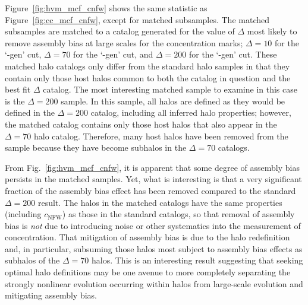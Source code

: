 \documentclass[usenatbib]{mnras}
\begin{document}
Figure~\ref{fig:hvm_mcf_cnfw} shows the same statistic as Figure~\ref{fig:cc_mcf_cnfw}, except for matched
subsamples. The matched subsamples are matched to a catalog generated for the value of $\Delta$ most likely to
remove assembly bias at large scales for the concentration marks; $\Delta=10$ for the `\simA -gen' cut, $\Delta=70$
for the `\simB -gen' cut, and $\Delta=200$ for the `\simC -gen' cut. These matched halo catalogs only differ from
the standard halo samples in that they contain only those host halos common 
to both the catalog in question and the best fit $\Delta$ catalog. The most interesting matched sample to 
examine in this case is the $\Delta=200$ sample. In this sample, all halos are defined as they would be 
defined in the $\Delta=200$ catalog, including all inferred halo properties; however, the matched catalog 
contains only those host halos that also appear in the $\Delta=70$ halo catalog. Therefore, many host 
halos have been removed from the sample because they have become subhalos in the $\Delta=70$ 
catalogs. 

From Fig.~\ref{fig:hvm_mcf_cnfw}, it is apparent that some degree of assembly bias persists in the matched 
samples. Yet, what is interesting is that a very significant fraction of the assembly bias effect has been 
removed compared to the standard $\Delta=200$ result. The halos in the matched catalogs have the 
same properties (including $c_{\mathrm{NFW}}$) as those in the standard catalogs, so that removal 
of assembly bias is {\em not} due to introducing noise or other systematics into the measurement of 
concentration. That mitigation of assembly bias is due to the halo redefinition and, in particular, 
subsuming those halos most subject to assembly bias effects as subhalos of the $\Delta=70$ 
halos. This is an interesting result suggesting that seeking optimal halo definitions may be 
one avenue to more completely separating the strongly nonlinear evolution occurring within 
halos from large-scale evolution and mitigating assembly bias. 
\end{document}
